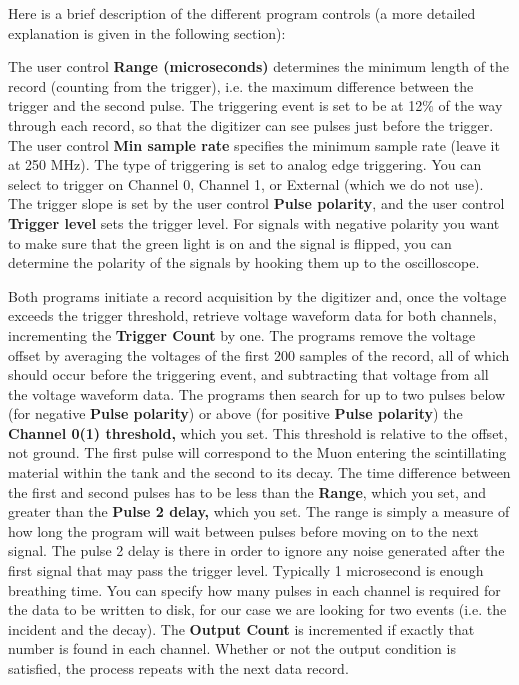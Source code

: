 \documentclass{../lab}
\begin{document}
Here is a brief description of the different program controls (a more detailed explanation is given in the following section):

The user control \textbf{Range (microseconds)} determines the minimum length of the record (counting from the trigger), i.e. the maximum difference between the trigger and the second pulse. The triggering event is set to be at 12\% of the way through each record, so that the digitizer can see pulses just before the trigger. The user control \textbf{Min sample rate} specifies the minimum sample rate (leave it at 250 MHz). The type of triggering is set to analog edge triggering. You can select to trigger on Channel 0, Channel 1, or External (which we do not use). The trigger slope is set by the user control \textbf{Pulse polarity}, and the user control \textbf{Trigger level} sets the trigger level. For signals with negative polarity you want to make sure that the green light is on and the signal is flipped, you can determine the polarity of the signals by hooking them up to the oscilloscope.

Both programs initiate a record acquisition by the digitizer and, once the voltage exceeds the trigger threshold, retrieve voltage waveform data for both channels, incrementing the \textbf{Trigger Count} by one. The programs remove the voltage offset by averaging the voltages of the first 200 samples of the record, all of which should occur before the triggering event, and subtracting that voltage from all the voltage waveform data. The programs then search for up to two pulses below (for negative \textbf{Pulse polarity}) or above (for positive \textbf{Pulse polarity}) the \textbf{Channel 0(1) threshold,} which you set. This threshold is relative to the offset, not ground. The first pulse will correspond to the Muon entering the scintillating material within the tank and the second to its decay. The time difference between the first and second pulses has to be less than the \textbf{Range}, which you set, and greater than the \textbf{Pulse 2 delay,} which you set. The range is simply a measure of how long the program will wait between pulses before moving on to the next signal. The pulse 2 delay is there in order to ignore any noise generated after the first signal that may pass the trigger level. Typically 1 microsecond is enough breathing time. You can specify how many pulses in each channel is required for the data to be written to disk, for our case we are looking for two events (i.e. the incident and the decay). The \textbf{Output Count} is incremented if exactly that number is found in each channel. Whether or not the output condition is satisfied, the process repeats with the next data record.
\end{document}
